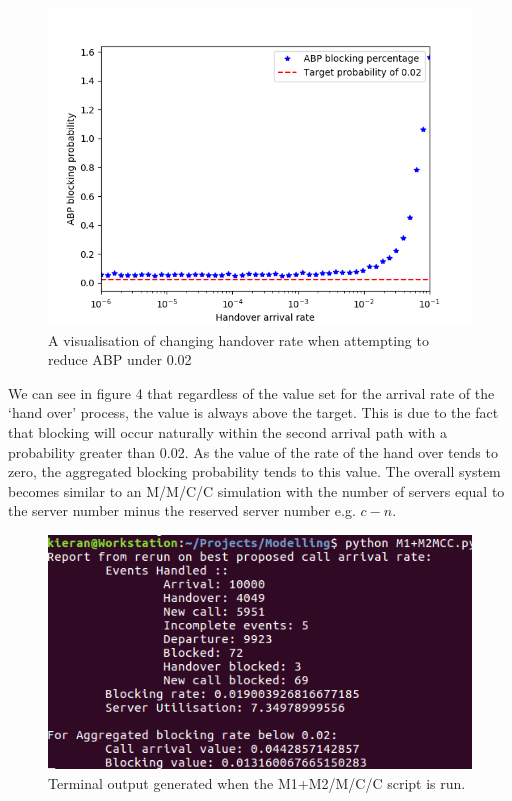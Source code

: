 \documentclass{ecmm427_assignment}
\begin{document}
\begin{figure}[H]
 \centering
\includegraphics[scale=0.65]{M1+M2MCCInvestigation.png}
\caption{A visualisation of changing handover rate when attempting to reduce ABP under 0.02}
\end{figure}

We can see in figure 4 that regardless of the value set for the arrival rate of the `hand over' process, the value is always above the target. This is due to the fact that blocking will occur naturally within the second arrival path with a probability greater than 0.02. As the value of the rate of the hand over tends to zero, the aggregated blocking probability tends to this value. The overall system becomes similar to an M/M/C/C simulation with the number of servers equal to the server number minus the reserved server number e.g. $c-n$.

\begin{figure}[H]
 \centering
\includegraphics[scale=0.65]{M1+M2MCCOutput.png}
\caption{Terminal output generated when the M1+M2/M/C/C script is run.}
\end{figure}
\end{document}
